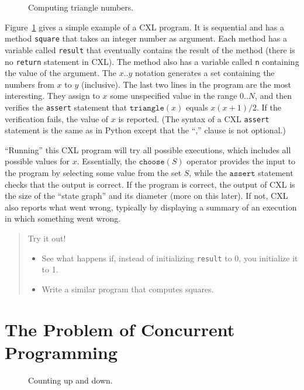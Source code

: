 \documentclass{book}
\newenvironment{code}{
\tcolorbox
}{
\endtcolorbox
}
\begin{document}
\begin{figure}
\begin{code}

\end{code}
\caption{Computing triangle numbers.}
\label{fig:triangle}
\end{figure}

Figure~\ref{fig:triangle} gives a simple example of a CXL program.
It is sequential and has a method \texttt{square} that takes
an integer number as argument.  Each method has a variable called
\texttt{result} that eventually contains the result of the
method (there is no \texttt{return} statement in CXL).  The method
also has a variable called \texttt{n} containing the value of the
argument.  The $x..y$ notation generates a set containing the numbers
from $x$ to $y$ (inclusive).  The last two lines in the program are
the most interesting.
They assign to $x$ some unspecified value in the range $0..N$, and then
verifies the \texttt{assert} statement that $\mathtt{triangle}(x)$
equals $x(x+1)/2$.
If the verification fails, the value of $x$ is reported.
(The syntax of a CXL \texttt{assert} statement is the same as in Python
except that the ``,'' clause is not optional.)

``Running'' this CXL program will try all possible executions, which
includes all possible values for $x$.  Essentially, the $\texttt{choose}(S)$
operator provides the input to the program by selecting some value from the
set $S$, while the $\texttt{assert}$ statement checks that the output is
correct.  If the program is correct, the output of CXL is the size of the
``state graph'' and its diameter (more on this later).  If not, CXL also
reports what went wrong, typically by displaying a summary of an execution in
which something went wrong.

\begin{quote}
Try it out!
\begin{itemize}
\item See what happens if, instead of initializing \texttt{result} to 0,
you initialize it to 1.
\item Write a similar program that computes squares.
\end{itemize}
\end{quote}

\chapter{The Problem of Concurrent Programming}

\begin{figure}
\begin{code}

\end{code}
\caption{Counting up and down.}
\label{fig:updown}
\end{figure}
\end{document}
